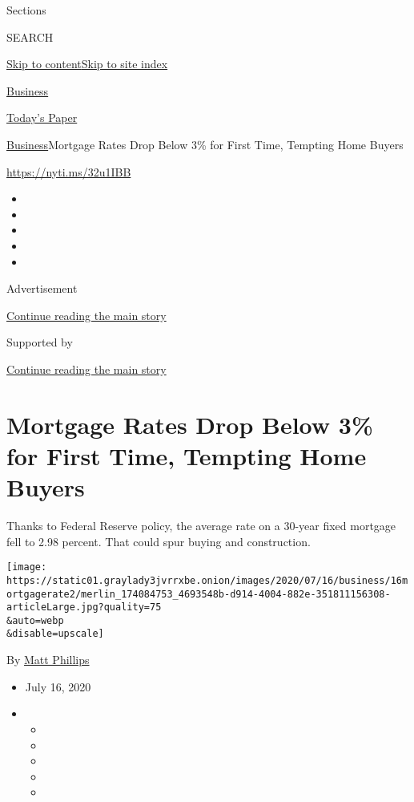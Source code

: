 Sections

SEARCH

\protect\hyperlink{site-content}{Skip to
content}\protect\hyperlink{site-index}{Skip to site index}

\href{https://www.nytimes3xbfgragh.onion/section/business}{Business}

\href{https://myaccount.nytimes3xbfgragh.onion/auth/login?response_type=cookie\&client_id=vi}{}

\href{https://www.nytimes3xbfgragh.onion/section/todayspaper}{Today's
Paper}

\href{/section/business}{Business}\textbar{}Mortgage Rates Drop Below
3\% for First Time, Tempting Home Buyers

\url{https://nyti.ms/32u1IBB}

\begin{itemize}
\item
\item
\item
\item
\item
\end{itemize}

Advertisement

\protect\hyperlink{after-top}{Continue reading the main story}

Supported by

\protect\hyperlink{after-sponsor}{Continue reading the main story}

\hypertarget{mortgage-rates-drop-below-3-for-first-time-tempting-home-buyers}{%
\section{Mortgage Rates Drop Below 3\% for First Time, Tempting Home
Buyers}\label{mortgage-rates-drop-below-3-for-first-time-tempting-home-buyers}}

Thanks to Federal Reserve policy, the average rate on a 30-year fixed
mortgage fell to 2.98 percent. That could spur buying and construction.

\texttt{[image: https://static01.graylady3jvrrxbe.onion/images/2020/07/16/business/16mortgagerate2/merlin\_174084753\_4693548b-d914-4004-882e-351811156308-articleLarge.jpg?quality=75\\\&auto=webp\\\&disable=upscale]}

By \href{https://www.nytimes3xbfgragh.onion/by/matt-phillips}{Matt
Phillips}

\begin{itemize}
\item
  July 16, 2020
\item
  \begin{itemize}
  \item
  \item
  \item
  \item
  \item
  \end{itemize}
\end{itemize}

